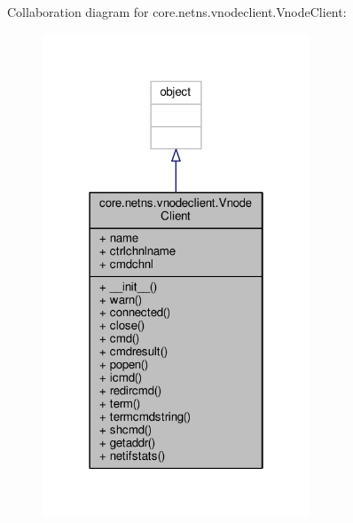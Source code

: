 Collaboration diagram for core.\+netns.\+vnodeclient.\+Vnode\+Client\+:
\nopagebreak
\begin{figure}[H]
\begin{center}
\leavevmode
\includegraphics[width=226pt]{classcore_1_1netns_1_1vnodeclient_1_1_vnode_client__coll__graph}
\end{center}
\end{figure}
